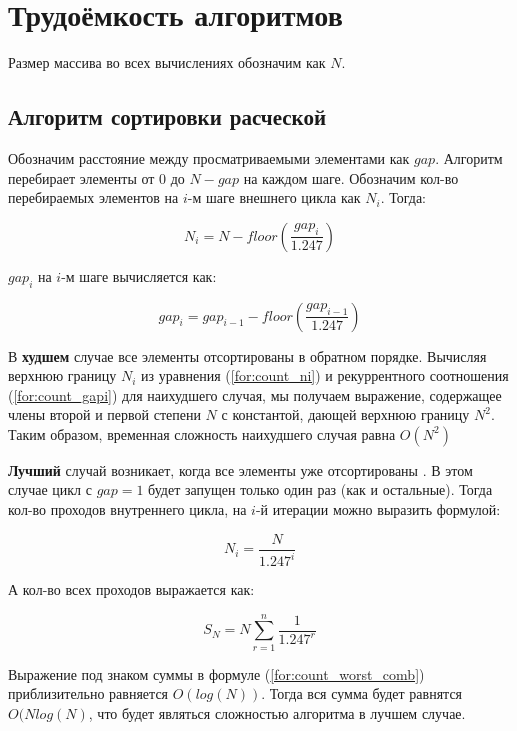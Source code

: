 \documentclass[12pt]{report}
\begin{document}
	\section{Трудоёмкость алгоритмов}

	Размер массива во всех вычислениях обозначим как $N$.

	\subsection{Алгоритм сортировки расческой}

	Обозначим расстояние между просматриваемыми элементами как $gap$. Алгоритм перебирает элементы от 0 до $N-gap$ на каждом шаге. Обозначим кол-во перебираемых элементов на $i$-м шаге внешнего цикла как $N_{i}$. Тогда:
	
	\begin{equation}
	\label{for:count_ni}
	N_{i} = N - floor(\frac{gap_{i}}{1.247})
	\end{equation}
	
	
	$gap_{i}$ на $i$-м шаге вычисляется как:
	
	
	\begin{equation}
	\label{for:count_gapi}
	gap_{i} = gap_{i-1} - floor(\frac{gap_{i-1}}{1.247})
	\end{equation}
	
	В \textbf{худшем} случае все элементы отсортированы в обратном порядке. Вычисляя верхнюю границу $N_{i}$ из уравнения (\ref{for:count_ni}) и рекуррентного соотношения (\ref{for:count_gapi}) для наихудшего случая, мы получаем выражение, содержащее члены второй и первой степени $N$ с константой, дающей верхнюю границу $N^2$. Таким образом, временная сложность наихудшего случая равна $O(N^2)$
	
	\textbf{Лучший} случай возникает, когда все элементы уже отсортированы . В этом случае цикл с $gap=1$ будет запущен только один раз (как и остальные). Тогда кол-во проходов внутреннего цикла, на $i$-й итерации можно выразить формулой:
	
	\begin{equation}
	N_{i}=\frac{N}{1.247^{i}}
	\end{equation}
	
	А кол-во всех проходов выражается как:

	\begin{equation}
	\label{for:count_worst_comb}
	S_{N}=N\sum_{r=1}^{n} \frac{1}{1.247^r}
	\end{equation}
	
	Выражение под знаком суммы в формуле (\ref{for:count_worst_comb}) приблизительно равняется $O(log(N))$. Тогда вся сумма будет равнятся $O(Nlog(N)$, что будет являться сложностью алгоритма в лучшем случае.
	
\end{document}
